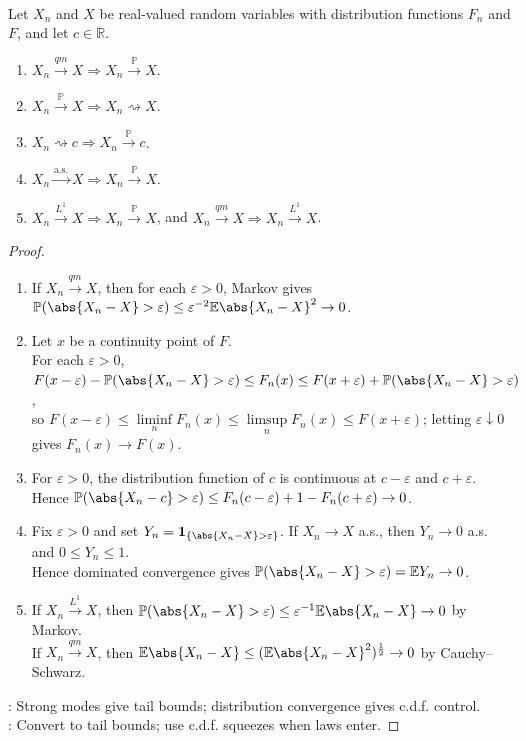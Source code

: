 \begin{theorem} \label{thm:probabilistic-convergence-implications} \\
Let $X_n$ and $X$ be real-valued random variables with distribution functions $F_n$ and $F$, and let $c\in\mathbb{R}$.
\begin{enumerate}[label=(\roman*)]
\setlength{\itemsep}{0pt}
\item $X_n\xrightarrow{qm}X\Rightarrow X_n\xrightarrow{\mathbb{P}}X$.
\item $X_n\xrightarrow{\mathbb{P}}X\Rightarrow X_n\rightsquigarrow X$.
\item $X_n\rightsquigarrow c\Rightarrow X_n\xrightarrow{\mathbb{P}}c$.
\item $X_n\xrightarrow{\mathrm{a.s.}}X\Rightarrow X_n\xrightarrow{\mathbb{P}}X$.
\item $X_n\xrightarrow{L^1}X\Rightarrow X_n\xrightarrow{\mathbb{P}}X$, and $X_n\xrightarrow{qm}X\Rightarrow X_n\xrightarrow{L^1}X$.
\end{enumerate}
\begin{proof}
\begin{enumerate}[label=(\roman*)]
\setlength{\itemsep}{0pt}
\item If $X_n\xrightarrow{qm}X$, then for each $\varepsilon>0$, Markov gives $\mathbb{P}(\abs{X_n-X}>\varepsilon)\leq\varepsilon^{-2}\mathbb{E}\abs{X_n-X}^2\to0$.
\item Let $x$ be a continuity point of $F$.\\
For each $\varepsilon>0$, $F(x-\varepsilon)-\mathbb{P}(\abs{X_n-X}>\varepsilon)\leq F_n(x)\leq F(x+\varepsilon)+\mathbb{P}(\abs{X_n-X}>\varepsilon)$,\\
so $F(x-\varepsilon)\leq\liminf\limits_n F_n(x)\leq\limsup\limits_n F_n(x)\leq F(x+\varepsilon)$; letting $\varepsilon\downarrow0$ gives $F_n(x)\to F(x)$.
\item For $\varepsilon>0$, the distribution function of $c$ is continuous at $c-\varepsilon$ and $c+\varepsilon$.\\
Hence $\mathbb{P}(\abs{X_n-c}>\varepsilon)\leq F_n(c-\varepsilon)+1-F_n(c+\varepsilon)\to0$.
\item Fix $\varepsilon>0$ and set $Y_n=\mathbf{1}_{\{\abs{X_n-X}>\varepsilon\}}$. If $X_n\to X$ a.s., then $Y_n\to0$ a.s. and $0\leq Y_n\leq1$.\\
Hence dominated convergence gives $\mathbb{P}(\abs{X_n-X}>\varepsilon)=\mathbb{E}Y_n\to0$.
\item If $X_n\xrightarrow{L^1}X$, then $\mathbb{P}(\abs{X_n-X}>\varepsilon)\leq\varepsilon^{-1}\mathbb{E}\abs{X_n-X}\to0$ by Markov.\\
If $X_n\xrightarrow{qm}X$, then $\mathbb{E}\abs{X_n-X}\leq(\mathbb{E}\abs{X_n-X}^2)^{\frac{1}{2}}\to0$ by Cauchy--Schwarz.
\end{enumerate}
: Strong modes give tail bounds; distribution convergence gives c.d.f. control.\\
: Convert to tail bounds; use c.d.f. squeezes when laws enter.
\end{proof}
\end{theorem}

